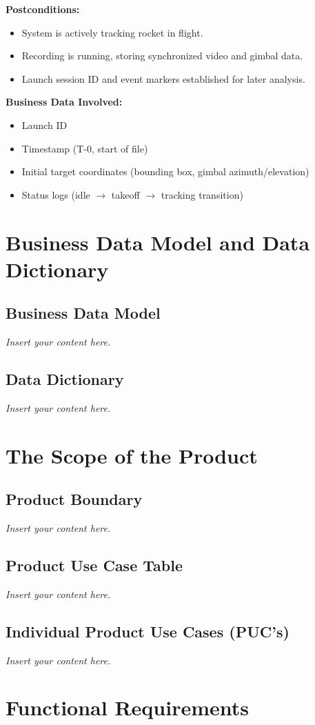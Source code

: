\documentclass[12pt]{article}
\newcommand{\lips}{\textit{Insert your content here.}}
\begin{document}
\textbf{Postconditions:}
\begin{itemize}
  \item System is actively tracking rocket in flight.
  \item Recording is running, storing synchronized video and gimbal data.
  \item Launch session ID and event markers established for later analysis.
\end{itemize}

\textbf{Business Data Involved:}
\begin{itemize}
  \item Launch ID
  \item Timestamp (T-0, start of file)
  \item Initial target coordinates (bounding box, gimbal azimuth/elevation)
  \item Status logs (idle $\rightarrow$ takeoff $\rightarrow$ tracking transition)
\end{itemize}

\section{Business Data Model and Data Dictionary}
\subsection{Business Data Model}
\lips
\subsection{Data Dictionary}
\lips

\section{The Scope of the Product}
\subsection{Product Boundary}
\lips
\subsection{Product Use Case Table}
\lips
\subsection{Individual Product Use Cases (PUC's)}
\lips

\section{Functional Requirements}
\end{document}
